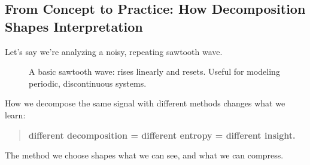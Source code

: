 \subsection{From Concept to Practice: How Decomposition Shapes Interpretation}

Let’s say we’re analyzing a noisy, repeating sawtooth wave. 

\begin{figure}[H]
\centering
{}
\caption{A basic sawtooth wave: rises linearly and resets. Useful for modeling periodic, discontinuous systems.}
\end{figure}


How we decompose the same signal with different methods changes what we learn:

\begin{quote}
\textbf{different decomposition = different entropy = different insight.} 
\end{quote}

The method we choose shapes what we can see, and what we can compress.

